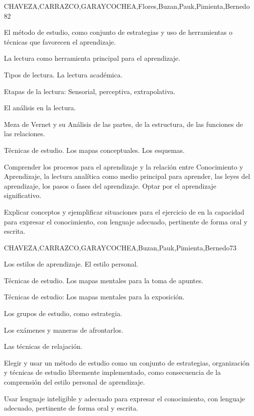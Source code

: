 \begin{syllabus}
\begin{unit}{}{CHAVEZA,CARRAZCO,GARAYCOCHEA,Flores,Buzan,Pauk,Pimienta,Bernedo}{8}{2}
\begin{topics}
        \item El método de estudio, como conjunto de estrategias y uso de herramientas o técnicas que favorecen el aprendizaje.
        \item La lectura como herramienta principal para el aprendizaje.
        \item Tipos de lectura. La lectura académica.
        \item Etapas de la lectura: Sensorial, perceptiva, extrapolativa.
        \item El análisis en la lectura.
        \item Meza de Vernet y su Análisis de las partes, de la estructura, de las funciones de las relaciones.
        \item Técnicas de estudio. Los mapas conceptuales. Los esquemas.
\end{topics}
\begin{learningoutcomes}
        \item Comprender los procesos para el aprendizaje y la relación entre Conocimiento y Aprendizaje, la  lectura analítica como medio principal para aprender, las leyes del aprendizaje, los pasos o fases del aprendizaje. Optar por el aprendizaje  significativo.
        \item Explicar conceptos y ejemplificar situaciones  para el ejercicio de en la capacidad para expresar el conocimiento, con lenguaje adecuado, pertinente de forma oral y escrita.
\end{learningoutcomes}
\end{unit}

\begin{unit}{}{CHAVEZA,CARRAZCO,GARAYCOCHEA,Buzan,Pauk,Pimienta,Bernedo}{7}{3}
\begin{topics}
        \item Los estilos de aprendizaje. El estilo personal.
        \item Técnicas de estudio. Los mapas mentales para la toma de apuntes.
        \item Técnicas de estudio: Los mapas mentales para la exposición.
        \item Los grupos de estudio, como estrategia.
        \item Los exámenes y maneras de afrontarlos.
        \item Las técnicas de relajación.
\end{topics}
\begin{learningoutcomes}
        \item Elegir y usar un método de estudio como un conjunto de estrategias, organización  y técnicas de estudio libremente implementado, como consecuencia  de la comprensión del estilo personal de aprendizaje.
        \item Usar lenguaje inteligible y adecuado para expresar el conocimiento, con lenguaje adecuado, pertinente de forma oral y escrita.
\end{learningoutcomes}
\end{unit}




\end{syllabus}
